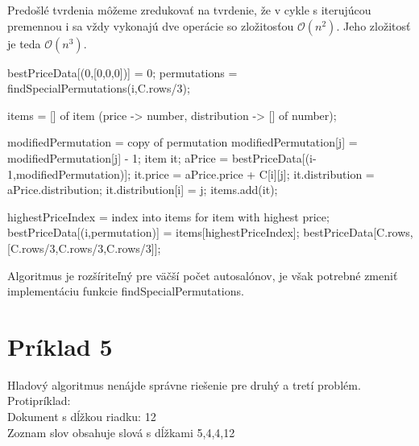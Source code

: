 \documentclass[paper=a4, fontsize=11pt]{scrartcl} %
\numberwithin{equation}{section} %
\numberwithin{figure}{section} %
\numberwithin{table}{section} %
\begin{document}
Predošlé tvrdenia môžeme zredukovať na tvrdenie, že v cykle s iterujúcou premennou i sa vždy vykonajú dve operácie so zložitosťou $\mathcal{O}(n^2)$.
Jeho zložitosť je teda $\mathcal{O}(n^3)$.


\begin{algorithmic}[1]
    bestPriceData[(0,[0,0,0])] = 0;
        \State permutations = findSpecialPermutations(i,C.rows/3);
				
            \State items = [] of item (price -> number, distribution -> [] of number); 
            
                \State modifiedPermutation = copy of permutation
		    \State modifiedPermutation[j] = modifiedPermutation[j] - 1;
		    \State	item it;
		    \State aPrice = bestPriceData[(i-1,modifiedPermutation)];
		    \State it.price = aPrice.price + C[i][j];
		    \State it.distribution = aPrice.distribution;
		    \State it.distribution[i] = j;
                    \State items.add(it);
                 \EndIf
            \EndFor			
		
            \State highestPriceIndex = index into items for item with highest price;
            \State bestPriceData[(i,permutation)] = items[highestPriceIndex];		
        \EndFor
    \EndFor
     \State \Return bestPriceData[C.rows,[C.rows/3,C.rows/3,C.rows/3]];
\EndFunction
\end{algorithmic}

Algoritmus je rozšíriteľný pre väčší počet autosalónov, je však potrebné zmeniť implementáciu funkcie findSpecialPermutations.

\pagebreak


\section*{Príklad 5}

Hladový algoritmus nenájde správne riešenie pre druhý a tretí problém. \\
Protipríklad: \\
Dokument s dĺžkou riadku: 12 \\
Zoznam slov obsahuje slová s dĺžkami 5,4,4,12 \\
\end{document}
